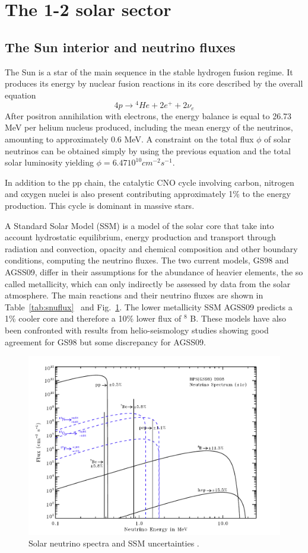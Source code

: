 \section{The 1-2 solar sector}
\label{sec:solar}

\subsection{The Sun interior and neutrino fluxes}

The Sun is a star of the main sequence in the stable hydrogen fusion regime. It produces its energy by nuclear fusion reactions in its core described by the overall equation
\begin{equation}
4p \rightarrow {^4}He + 2 e^+ + 2 \nu_e
\end{equation}
After positron annihilation with electrons, the energy balance is equal to 26.73 MeV per helium nucleus produced, including the mean energy of the neutrinos, amounting to approximately 0.6 MeV. A constraint on the total flux $\phi$ of solar neutrinos can be obtained simply by using the previous equation and the total solar luminosity yielding 
$\phi = 6.47 10^{10} cm^{-2} s^{-1}$.

In addition to the pp chain, the catalytic CNO cycle involving carbon, nitrogen and oxygen nuclei is also present contributing approximately 1\% to the energy production.
This cycle is dominant in massive stars.

A Standard Solar Model (SSM) is a model of the solar core that take into account hydrostatic equilibrium, energy production and transport through radiation and convection, opacity and chemical composition and other boundary conditions, computing the neutrino fluxes.
The two current models, GS98 and AGSS09, differ in their assumptions for the abundance of heavier elements, the so called metallicity, which can only indirectly be assessed by data from the solar atmosphere. 
The main reactions and their neutrino fluxes are shown in Table~\ref{tab:snuflux}~\cite{serenelli} and Fig.~\ref{fig:sol-spectra}. 
The lower metallicity SSM AGSS09 predicts a 1\% cooler core and therefore a 10\% lower flux of $^8$ B. These models have also been confronted with results from helio-seismology studies showing good agreement for GS98 but some discrepancy for AGSS09.


\begin{figure}[htbp]
\centering
\includegraphics[width=0.6\linewidth]{figures/nu_spectrum1.pdf}
  \caption{
Solar neutrino spectra and SSM uncertainties \cite{serenellif}. 
}
 \label{fig:sol-spectra}
 \end{figure}


